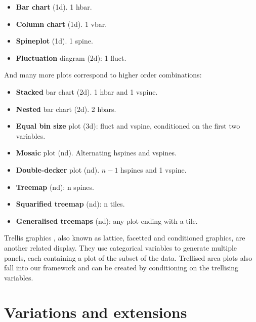 \documentclass[journal]{vgtc}
\begin{document}
\begin{itemize}
  \setlength{\itemsep}{0em}
  \item {\bf Bar chart} (1d). 1 hbar.
  \item {\bf Column chart} (1d). 1 vbar.
  \item {\bf Spineplot} (1d). 1 spine.
  \item {\bf Fluctuation} diagram (2d): 1 fluct.
\end{itemize}

\noindent And many more plots correspond to higher order combinations:

\begin{itemize}
  \setlength{\itemsep}{0em}
  
  \item {\bf Stacked} bar chart (2d). 1 hbar and 1 vspine.

  \item {\bf Nested} bar chart \citep{peltier:2009} (2d).  2 hbars. 

  \item {\bf Equal bin size} \citep{hofmann:2000} plot (3d): fluct and vspine, conditioned on the first two variables.

  \item {\bf Mosaic} plot \citep{hartigan:1981,friendly:1994,hofmann:2003} (nd). Alternating hspines and vspines. 

  \item {\bf Double-decker} plot \citep{hofmann:2001} (nd). $n-1$ hspines and 1 vspine. 

  \item {\bf Treemap} \citep{shneiderman:1992} (nd): n spines.

  \item {\bf Squarified treemap} \citep{bruls:1999} (nd): n tiles. 

  \item {\bf Generalised treemaps} \citep{vliegen:2006} (nd): any plot ending with a tile.

\end{itemize}

Trellis graphics \citep{becker:1996}, also known as lattice, facetted and conditioned graphics, are another related display. They use categorical variables to generate multiple panels, each containing a plot of the subset of the data. Trellised area plots also fall into our framework and can be created by conditioning on the trellising variables.


\section{Variations and extensions}
\label{sec:variations}
\end{document}
